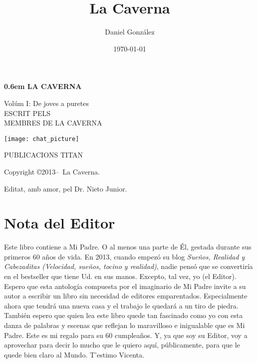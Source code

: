 \documentclass[11pt,twoside,openany]{book}
\title{La Caverna}
\author{
  Daniel Gonz\'alez
}
\date{\today}
\def\secondpage{\clearpage\null\vfill
\pagestyle{empty}
\begin{minipage}[b]{0.9\textwidth}
\footnotesize\raggedright
\setlength{\parskip}{0.5\baselineskip}
Copyright \copyright 2013--\the\year\ La Caverna.\par
Editat, amb amor, pel Dr. Nieto Junior.
\end{minipage}
\vspace*{2\baselineskip}
\cleardoublepage
\rfoot{\thepage}}
\newcommand\blankpage{%
    \null
    \thispagestyle{empty}%
    \addtocounter{page}{-1}%
    \newpage}
\begin{document}
\clearpage
\newcommand\nbvspace[1][3]{\vspace*{\stretch{#1}}}
\newcommand\nbstretchyspace{\spaceskip0.5em plus 0.25em minus 0.25em}
\newcommand{\nbtitlestretch}{\spaceskip0.6em}
\pagestyle{empty}
\begin{center}
\bfseries
\nbvspace[1]
\Huge
{\nbtitlestretch\huge
LA CAVERNA}

\nbvspace[1]
\normalsize

Vol\'um I: De joves a puretes\\

\nbvspace[1]
\small ESCRIT PELS\\
\Large MEMBRES DE LA CAVERNA\\[0.5em]

\nbvspace[2]

\texttt{[image: chat\_picture]}
\nbvspace[3]
\normalsize

\nbvspace[2]
\large
PUBLICACIONS TITAN
\nbvspace[1]
\end{center}

\afterpage{\blankpage}


\secondpage

\tableofcontents

\chapter*{Nota del Editor}

Este libro contiene a Mi Padre.
O al menos una parte de Él, gestada durante sus primeros 60 años de vida.
En 2013, cuando empezó su blog \emph{Sueños, Realidad y Cabezaditas (Velocidad, sueños, tocino y realidad)}, nadie pensó que se convertiría en el bestseller que tiene Ud. en sus manos.
Excepto, tal vez, yo (el Editor).
Espero que esta antología compuesta por el imaginario de Mi Padre invite a su autor a escribir un libro sin necesidad de editores emparentados.
Especialmente ahora que tendrá una nueva casa y el trabajo le quedará a un tiro de piedra.
También espero que quien lea este libro quede tan fascinado como yo con esta danza de palabras y escenas que reflejan lo maravilloso e inigualable que es Mi Padre.
Este es mi regalo para su 60 cumpleaños.
Y, ya que soy su Editor, voy a aprovechar para decir lo mucho que le quiero aquí, públicamente, para que le quede bien claro al Mundo.
T'estimo Vicenta.
\end{document}
